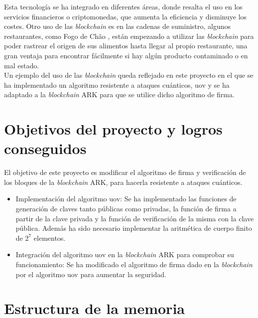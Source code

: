 Esta tecnología se ha integrado en diferentes áreas, donde resalta el uso en los servicios financieros o criptomonedas, que aumenta la eficiencia y disminuye los costes. Otro uso de las \textit{blockchain} es en las cadenas de suministro, algunos restaurantes, como Fogo de Ch\~{a}o \cite{Fogo-Chao}, están empezando a utilizar las \textit{blockchain} para poder rastrear el origen de sus alimentos hasta llegar al propio restaurante, una gran ventaja para encontrar fácilmente si hay algún producto contaminado o en mal estado. \\

Un ejemplo del uso de las \textit{blockchain} queda reflejado en este proyecto en el que se ha implementado un algoritmo resistente a ataques cuánticos, \acrshort{uov} \cite{algoritmo-UOV} y se ha adaptado a la \textit{blockchain} ARK \cite{ark} para que se utilice dicho algoritmo de firma.\\


\section{Objetivos del proyecto y logros conseguidos}
\label{sec:intro:objetivos}
El objetivo de este proyecto es modificar el algoritmo de firma y verificación de los bloques de la \textit{blockchain} ARK, para hacerla resistente a ataques cuánticos.\\

\begin{itemize}
	\item Implementación del algoritmo \acrshort{uov}: Se ha implementado las funciones de generación de claves tanto públicas como privadas, la función de firma a partir de la clave privada y la función de verificación de la misma con la clave pública. Además ha sido necesario implementar la aritmética de cuerpo finito de $2^7$ elementos.
	\item Integración del algoritmo \acrshort{uov} en la \textit{blockchain} ARK para comprobar su funcionamiento: Se ha modificado el algoritmo de firma dado en la \textit{blockchain} por el algoritmo \acrshort{uov} para aumentar la seguridad.

\end{itemize}


\section{Estructura de la memoria}

